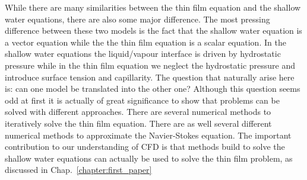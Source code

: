 While there are many similarities between the thin film equation and the shallow water equations, there are also some major difference.
The most pressing difference between these two models is the fact that the shallow water equation is a vector equation while the the thin film equation is a scalar equation.
In the shallow water equations the liquid/vapour interface is driven by hydrostatic pressure while in the thin film equation we neglect the hydrostatic pressure and introduce surface tension and capillarity.
The question that naturally arise here is: can one model be translated into the other one?
Although this question seems odd at first it is actually of great significance to show that problems can be solved with different approaches.
There are several numerical methods to iteratively solve the thin film equation.
There are as well several different numerical methods to approximate the Navier-Stokes equation.
The important contribution to our understanding of CFD is that methods build to solve the shallow water equations can actually be used to solve the thin film problem, as discussed in Chap.~\ref{chapter:first_paper}